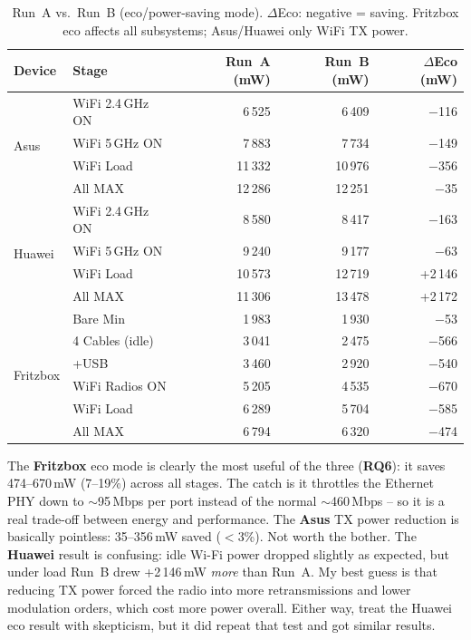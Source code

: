 \begin{table}[H]
    \centering
    \caption{Run~A vs.\ Run~B (eco/power-saving mode). $\Delta$Eco: negative = saving. Fritzbox eco affects all subsystems; Asus/Huawei only WiFi TX power.}
    \label{tab:test3_eco}
    \small\renewcommand{\arraystretch}{0.88}
    \begin{tabular}{l l r r r}
        \toprule
        \textbf{Device} & \textbf{Stage} & \textbf{Run~A (mW)} & \textbf{Run~B (mW)} & \textbf{$\Delta$Eco (mW)} \\
        \midrule
        \multirow{4}{*}{Asus}
            & WiFi 2.4\,GHz ON  & 6\,525  & 6\,409  & $-$116 \\
            & WiFi 5\,GHz ON    & 7\,883  & 7\,734  & $-$149 \\
            & WiFi Load         & 11\,332 & 10\,976 & $-$356 \\
            & All MAX           & 12\,286 & 12\,251 & $-$35 \\
        \midrule
        \multirow{4}{*}{Huawei}
            & WiFi 2.4\,GHz ON  & 8\,580  & 8\,417  & $-$163 \\
            & WiFi 5\,GHz ON    & 9\,240  & 9\,177  & $-$63 \\
            & WiFi Load         & 10\,573 & 12\,719 & +2\,146 \\
            & All MAX           & 11\,306 & 13\,478 & +2\,172 \\
        \midrule
        \multirow{6}{*}{Fritzbox}
            & Bare Min          & 1\,983  & 1\,930  & $-$53 \\
            & 4 Cables (idle)   & 3\,041  & 2\,475  & $-$566 \\
            & +\ac{USB}              & 3\,460  & 2\,920  & $-$540 \\
            & WiFi Radios ON    & 5\,205  & 4\,535  & $-$670 \\
            & WiFi Load         & 6\,289  & 5\,704  & $-$585 \\
            & All MAX           & 6\,794  & 6\,320  & $-$474 \\
        \bottomrule
    \end{tabular}
\end{table}

The \textbf{Fritzbox} eco mode is clearly the most useful of the three (\textbf{RQ6}): it saves 474--670\,mW (7--19\%) across all stages. The catch is it throttles the Ethernet PHY down to $\sim$95\,Mbps per port instead of the normal $\sim$460\,Mbps -- so it is a real trade-off between energy and performance.
The \textbf{Asus} TX power reduction is basically pointless: 35--356\,mW saved ($<$3\%). Not worth the bother.
The \textbf{Huawei} result is confusing: idle Wi-Fi power dropped slightly as expected, but under load Run~B drew +2\,146\,mW \emph{more} than Run~A. My best guess is that reducing TX power forced the radio into more retransmissions and lower modulation orders, which cost more power overall. Either way, treat the Huawei eco result with skepticism, but it did repeat that test and got similar results.

